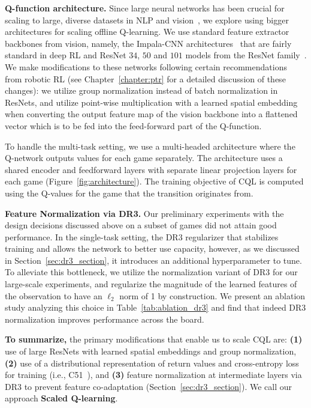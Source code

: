 \textbf{Q-function architecture.} 
Since large neural networks has been crucial for scaling to large, diverse datasets in NLP and vision~\citep[e.g.,][]{tan2019efficientnet, brown2020language, kaplan2020scaling}, we explore using bigger architectures for scaling offline Q-learning. We use standard feature extractor backbones from vision, namely, the Impala-CNN architectures~\citep{espeholt2018impala} that are fairly standard in deep RL and ResNet $34$, $50$ and $101$ models from the ResNet family~\citep{resnet}. We make modifications to these networks following certain recommendations from robotic RL (see Chapter~\ref{chapter:ptr} for a detailed discussion of these changes): we utilize group normalization instead of batch normalization in ResNets, and utilize point-wise multiplication with a learned spatial embedding when converting the output feature map of the vision backbone into a flattened vector which is to be fed into the feed-forward part of the Q-function. 

To handle the multi-task setting, we use a multi-headed architecture where the Q-network outputs values for each game separately. The architecture uses a shared encoder and feedforward layers with separate linear projection layers for each game (Figure~\ref{fig:architecture}). The training objective of CQL is computed using the Q-values for the game that the transition originates from. 

\textbf{{Feature Normalization via DR3.}}
Our preliminary experiments with the design decisions discussed above on a subset of games did not attain good performance. In the single-task setting, the DR3 regularizer that stabilizes training and allows the network to better use capacity, however, as we discussed in Section~\ref{sec:dr3_section}, it introduces an additional hyperparameter to tune. To alleviate this bottleneck, we utilize the normalization variant of DR3 for our large-scale experiments, and regularize the magnitude of the learned features of the observation to have an $\ell_2$ norm of 1 by construction. We present an ablation study analyzing this choice in Table~\ref{tab:ablation_dr3} and find that indeed DR3 normalization improves performance across the board. 

\begin{tcolorbox}[colback=blue!6!white,colframe=black,boxsep=0pt,top=3pt,bottom=5pt]
\textbf{To summarize,} the primary modifications that enable us to scale CQL are: \textbf{(1)} use of large ResNets with learned spatial embeddings and group normalization,
\textbf{(2)} use of a distributional representation of return values and cross-entropy loss for training (i.e., C51~\citep{bellemare2017distributional}), and \textbf{(3)} feature normalization at intermediate layers via DR3 to prevent feature co-adaptation (Section~\ref{sec:dr3_section}). We call our approach \textbf{Scaled Q-learning}.
\end{tcolorbox} 
